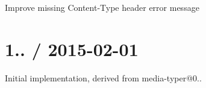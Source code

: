 
\begin{DoxyItemize}
\item Improve missing {\ttfamily Content-\/\+Type} header error message
\end{DoxyItemize}

\section*{1.. / 2015-\/02-\/01 }


\begin{DoxyItemize}
\item Initial implementation, derived from {\ttfamily media-\/typer@0..} 
\end{DoxyItemize}